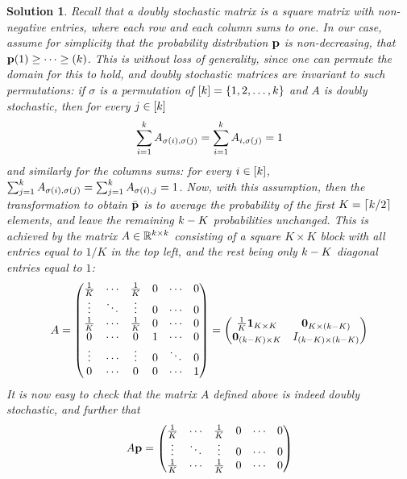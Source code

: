 \documentclass[biber]{nowfnt} %
\newtheorem{solution}{Solution}[chapter]
\begin{document}
\begin{solution}
Recall that a doubly stochastic matrix is a square matrix with non-negative entries, where each row and each column sums to one. In our case, assume for simplicity that the probability distribution $\mathbf{p}$ is non-decreasing, \ie that $\mathbf{p}(1)\geq \dots \geq(k)$. This is without loss of generality, since one can permute the domain for this to hold, and doubly stochastic matrices are invariant to such permutations: if $\sigma$ is a permutation of $[k]=\{1,2,\dots,k\}$ and $A$ is doubly stochastic, then for every $j\in[k]$
\[
	\sum_{i=1}^k A_{\sigma(i),\sigma(j)} = \sum_{i=1}^k A_{i,\sigma(j)} = 1
\]
and similarly for the columns sums: for every $i\in[k]$, $\sum_{j=1}^k A_{\sigma(i),\sigma(j)} = \sum_{j=1}^k A_{\sigma(i), j} = 1$. Now, with this assumption, then the transformation to obtain $\bar{\mathbf{p}}$ is to average the probability of the first $K=\clg{\ab/2}$ elements, and leave the remaining $k-K$ probabilities unchanged. This is achieved by the matrix $A\in\mathbb{R}^{k\times k}$ consisting of a square $K\times K$ block with all entries equal to $1/K$ in the top left, and the rest being only $k-K$ diagonal entries equal to $1$:
\[
	A = 
	\begin{pmatrix}
	\frac{1}{K} & \cdots & \frac{1}{K} & 0 &\cdots & 0\\
	\vdots & \ddots & \vdots & 0 &\cdots & 0\\
	\frac{1}{K} & \cdots & \frac{1}{K} & 0 &\cdots & 0\\
	0 & \cdots & 0 & 1 &\cdots & 0\\
	\vdots & \cdots & \vdots & 0 &\ddots & 0\\
	0 & \cdots & 0 & 0 &\cdots & 1\\
	\end{pmatrix} =
	\begin{pmatrix}
	\frac{1}{K} \mathbf{1}_{K\times K} & \mathbf{0}_{K\times (k-K)} \\
	\mathbf{0}_{(k-K)\times K} & {I}_{(k-K)\times (k-K)} \\
	\end{pmatrix}
\]
It is now easy to check that the matrix $A$ defined above is indeed doubly stochastic, and further that
\[
	A \mathbf{p} = 	\begin{pmatrix}
	\frac{1}{K} & \cdots & \frac{1}{K} & 0 &\cdots & 0\\
	\vdots & \ddots & \vdots & 0 &\cdots & 0\\
	\frac{1}{K} & \cdots & \frac{1}{K} & 0 &\cdots & 0\\

\end{pmatrix}\]
\end{solution}
\end{document}
